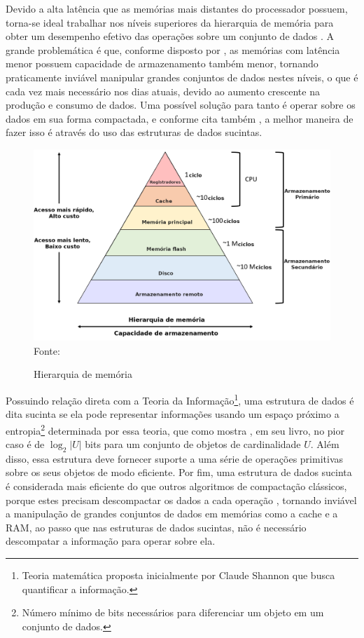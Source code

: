 Devido  a alta latência que as memórias mais distantes do processador possuem, torna-se ideal trabalhar nos níveis superiores da hierarquia de memória para obter um desempenho efetivo das operações sobre um conjunto de dados  \citep{book-compact-data-structures}. A grande problemática é que, conforme disposto por \cite{paper-gap-between-processor-memory}, as memórias com latência menor possuem capacidade de armazenamento também menor, tornando praticamente inviável manipular grandes conjuntos de dados nestes níveis, o que é cada vez mais necessário nos dias atuais, devido ao aumento crescente na produção e consumo de dados. Uma possível solução para tanto é operar sobre os dados em sua forma compactada, e conforme cita também \cite{coira-feranando}, a melhor maneira de fazer isso é através do uso das estruturas de dados sucintas.
\begin{figure}[!ht]
    \centering
    \caption{Hierarquia de memória}
    \includegraphics[scale=0.63]{images/hierarquia-memory-2.png}
    \footnotesize{Fonte: \cite{memory-hierarchy}}
  \label{fig:hierarquia-de-memoria}
\end{figure}

Possuindo relação direta com a Teoria da Informação\footnote{Teoria matemática proposta inicialmente por Claude Shannon que busca quantificar a informação.}, uma estrutura de dados é dita sucinta se ela pode representar informações usando um espaço próximo a entropia\footnote{Número mínimo de bits necessários para diferenciar um objeto em um conjunto de dados.} determinada por essa teoria, que como mostra \cite{book-compact-data-structures},  em seu livro, no pior caso é de $\log_2 |U|$ bits para um conjunto de objetos de cardinalidade $U$. Além disso, essa estrutura deve fornecer suporte a uma série de operações primitivas sobre os seus objetos de modo eficiente. Por fim, uma estrutura de dados sucinta é considerada mais eficiente do que outros algoritmos de compactação clássicos, porque estes precisam descompactar os dados a cada operação \citep{coira-feranando}, tornando inviável a manipulação de grandes conjuntos de dados em memórias como a cache e a RAM, ao passo que nas estruturas de dados sucintas, não é necessário descompatar a informação para operar sobre ela.



